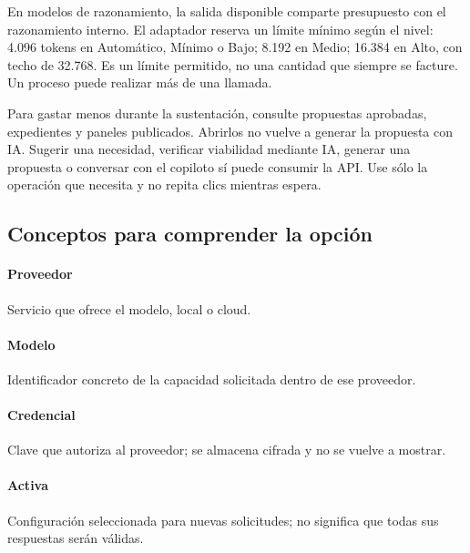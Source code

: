 En modelos de razonamiento, la salida disponible comparte presupuesto con el razonamiento interno. El adaptador reserva un límite mínimo según el nivel: 4.096 tokens en Automático, Mínimo o Bajo; 8.192 en Medio; 16.384 en Alto, con techo de 32.768. Es un límite permitido, no una cantidad que siempre se facture. Un proceso puede realizar más de una llamada.

Para gastar menos durante la sustentación, consulte propuestas aprobadas, expedientes y paneles publicados. Abrirlos no vuelve a generar la propuesta con IA. Sugerir una necesidad, verificar viabilidad mediante IA, generar una propuesta o conversar con el copiloto sí puede consumir la API. Use sólo la operación que necesita y no repita clics mientras espera.

\subsection{Conceptos para comprender la opción}
\paragraph{Proveedor} Servicio que ofrece el modelo, local o cloud.

\paragraph{Modelo} Identificador concreto de la capacidad solicitada dentro de ese proveedor.

\paragraph{Credencial} Clave que autoriza al proveedor; se almacena cifrada y no se vuelve a mostrar.

\paragraph{Activa} Configuración seleccionada para nuevas solicitudes; no significa que todas sus respuestas serán válidas.

